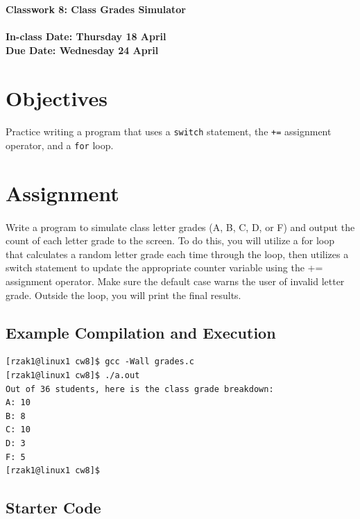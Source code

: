 \documentclass[letter,11pt]{article}
\begin{document}
\huge
\textbf{Classwork 8: Class Grades Simulator}
\normalsize
\\ ~~ \\
\textbf{In-class Date: Thursday 18 April} \\
\textbf{Due Date: Wednesday 24 April}

\section*{Objectives}
\paragraph{}Practice writing a program that uses a \texttt{switch} statement, the \texttt{+=} assignment operator, and a \texttt{for} loop.

\section*{Assignment}
\paragraph{}Write a program to simulate class letter grades (A, B, C, D, or F) and output the count of each letter grade to the screen. To do this, you will utilize a for loop that calculates a random letter grade each time through the loop, then utilizes a switch statement to update the appropriate counter variable using the += assignment operator. Make sure the default case warns the user of invalid letter grade. Outside the loop, you will print the final results.

\subsection*{Example Compilation and Execution}
\begin{verbatim}
[rzak1@linux1 cw8]$ gcc -Wall grades.c
[rzak1@linux1 cw8]$ ./a.out
Out of 36 students, here is the class grade breakdown:
A: 10
B: 8
C: 10
D: 3
F: 5
[rzak1@linux1 cw8]$ 
\end{verbatim}

\subsection*{Starter Code}
\end{document}

